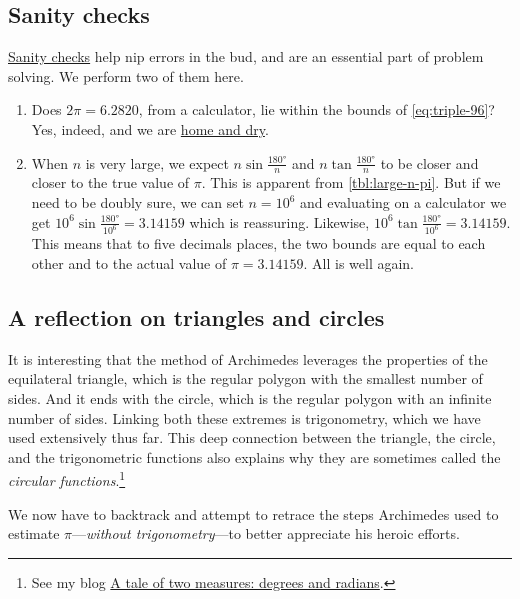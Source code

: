 \documentclass[
  a4paper,
]{article}
\begin{document}
\subsection{Sanity checks}\label{sanity-checks}

\href{https://en.wiktionary.org/wiki/sanity_check}{Sanity checks} help
nip errors in the bud, and are an essential part of problem solving. We
perform two of them here.

\begin{enumerate}
\item
  Does \(2\pi = 6.2820\), from a calculator, lie within the bounds of
  \cref{eq:triple-96}? Yes, indeed, and we are
  \href{https://dictionary.cambridge.org/dictionary/english/be-home-and-dry}{home
  and dry}.
\item
  When \(n\) is very large, we expect \(n\sin\frac{180°}{n}\) and
  \(n\tan\frac{180°}{n}\) to be closer and closer to the true value of
  \(\pi\). This is apparent from \cref{tbl:large-n-pi}. But if we need
  to be doubly sure, we can set \(n = 10^6\) and evaluating on a
  calculator we get \(10^6\sin\frac{180°}{10^6} = 3.14159\) which is
  reassuring. Likewise, \(10^6\tan\frac{180°}{10^6} = 3.14159\). This
  means that to five decimals places, the two bounds are equal to each
  other and to the actual value of \(\pi = 3.14159\). All is well again.
\end{enumerate}

\subsection{A reflection on triangles and
circles}\label{a-reflection-on-triangles-and-circles}

It is interesting that the method of Archimedes leverages the properties
of the equilateral triangle, which is the regular polygon with the
smallest number of sides. And it ends with the circle, which is the
regular polygon with an infinite number of sides. Linking both these
extremes is trigonometry, which we have used extensively thus far. This
deep connection between the triangle, the circle, and the trigonometric
functions also explains why they are sometimes called the \emph{circular
functions}.\footnote{See my blog
  \href{https://swanlotus.netlify.app/blogs/a-tale-of-two-measures-degrees-and-radians}{A
  tale of two measures: degrees and radians}.}

We now have to backtrack and attempt to retrace the steps Archimedes
used to estimate \(\pi\)---\emph{without trigonometry}---to better
appreciate his heroic efforts.
\end{document}
